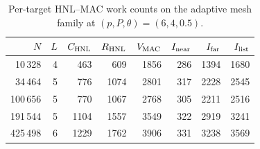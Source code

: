 \begin{table}[!htbp]
\centering
\caption{Per-target HNL--MAC work counts on the adaptive mesh family at $(p,P,\theta)=(6,4,0.5)$.}
\label{tab:adaptive_bounded_work}
\small
\setlength{\tabcolsep}{4pt}
\begin{tabular}{rrrrrrrr}
\toprule
$N$ & $L$ & $C_{\rm HNL}$ & $R_{\rm HNL}$ & $V_{\rm MAC}$ & $I_{\rm near}$ & $I_{\rm far}$ & $I_{\rm list}$ \\
\midrule
10\,328 & 4 & 463 & 609 & 1856 & 286 & 1394 & 1680 \\
34\,464 & 5 & 776 & 1074 & 2801 & 317 & 2228 & 2545 \\
100\,656 & 5 & 770 & 1067 & 2768 & 305 & 2211 & 2516 \\
191\,544 & 5 & 1104 & 1557 & 3549 & 322 & 2919 & 3241 \\
425\,498 & 6 & 1229 & 1762 & 3906 & 331 & 3238 & 3569 \\
\bottomrule
\end{tabular}
\end{table}
